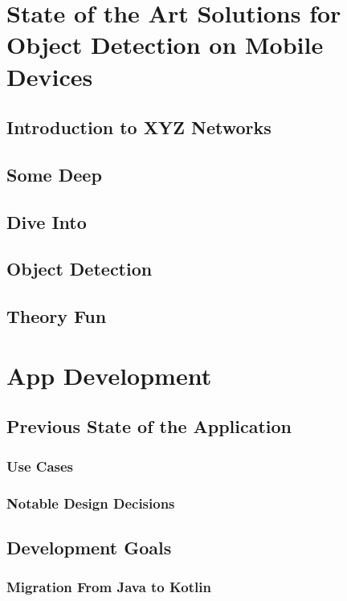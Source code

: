 \documentclass[
			   fontsize=11pt,
               paper=a4,
               bibliography=totoc,
               idxtotoc,
               headsepline,
               footsepline,
               footinclude=false,
               BCOR=12mm,
               DIV=13,
               openany,   %
               ]
               {scrbook}
\begin{document}
\chapter{State of the Art Solutions for Object Detection on Mobile Devices}

\section{Introduction to XYZ Networks}

\section{Some Deep}
\section{Dive Into}
\section{Object Detection}
\section{Theory Fun}

\chapter{App Development}

\section{Previous State of the Application}

\subsection{Use Cases}

\subsection{Notable Design Decisions}

\section{Development Goals}

\subsection{Migration From Java to Kotlin}
\end{document}
